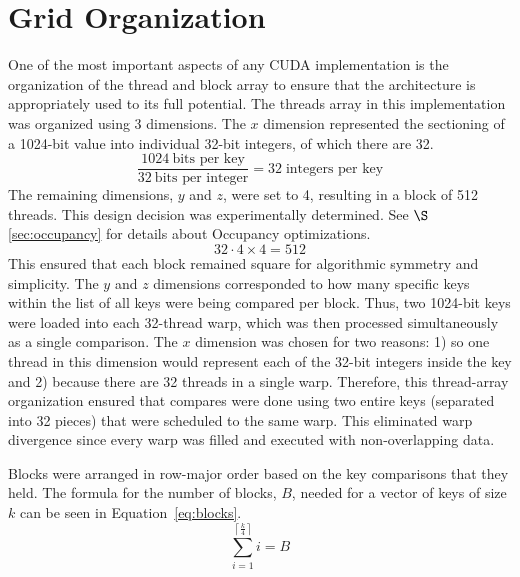 \documentclass[12pt]{ucthesis}
\begin{document}


\section{Grid Organization}
\label{sec:gridorg}
One of the most important aspects of any CUDA implementation is the 
organization of the thread and block array to ensure that the architecture is 
appropriately used to its full potential. The threads array in this 
implementation was organized using 3 dimensions. The $x$ dimension represented 
the sectioning of a 1024-bit value into individual 32-bit integers, of which 
there are 32. 
\begin{displaymath}
   \frac{1024 \:\mbox{bits per key}}{32 \:\mbox{bits per integer}} = 
   32 \;\mbox{integers per key}
\end{displaymath}
The remaining dimensions, $y$ and $z$, were set to 4, resulting in a block of 
512 threads. This design decision was experimentally determined. See 
$\S$\ref{sec:occupancy} for details about Occupancy optimizations.
\begin{displaymath}
   32 \cdot 4 \times 4 = 512
\end{displaymath}
This ensured that each block remained square for algorithmic 
symmetry and simplicity. The $y$ and $z$ dimensions corresponded to how many 
specific keys within the list of all keys were being compared per block. 
Thus, two 1024-bit keys were loaded into each 32-thread warp, which was 
then processed simultaneously as a single comparison. The $x$ dimension was 
chosen for two reasons: 1) so one thread in this dimension would represent 
each of the 32-bit integers inside the key and 2) because there are 32 threads 
in a single warp. Therefore, this thread-array organization ensured that 
compares were done using two entire keys (separated into 32 pieces) that were 
scheduled to the same warp. This eliminated warp divergence since every warp 
was filled and executed with non-overlapping data.

Blocks were arranged in row-major order based on the key comparisons that they 
held. The formula for the number of blocks, $B$, needed for a vector of keys of 
size $k$ can be seen in Equation~\ref{eq:blocks}.
\begin{equation}
   \sum_{i=1}^{\left\lceil \frac{k}{4} \right\rceil}i = B
   \label{eq:blocks}
\end{equation}
\end{document}
